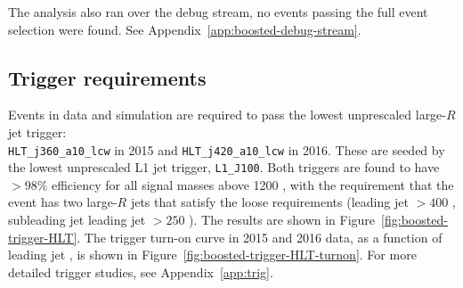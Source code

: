 The analysis also ran over the debug stream, no events passing the full event selection were found. See Appendix~\ref{app:boosted-debug-stream}.


\subsection{Trigger requirements}
\label{evt-sel:trig}

Events in data and simulation are required to pass the lowest unprescaled large-$R$ jet trigger: \\
\verb|HLT_j360_a10_lcw| in 2015 and \verb|HLT_j420_a10_lcw| in 2016. These are seeded by the lowest unprescaled L1 jet trigger, \texttt{L1\_J100}. Both triggers are found to have $>98\%$ efficiency for all signal masses above 1200 \GeV, with the requirement that the event has two large-$R$ jets that satisfy the loose \pt requirements (leading jet \pt $> 400$ \GeV, subleading jet leading jet \pt $> 250$ \GeV). The results are shown in Figure~\ref{fig:boosted-trigger-HLT}. The trigger turn-on curve in 2015 and 2016 data, as a function of leading jet \pt, is shown in Figure~\ref{fig:boosted-trigger-HLT-turnon}. For more detailed trigger studies, see Appendix~\ref{app:trig}.

